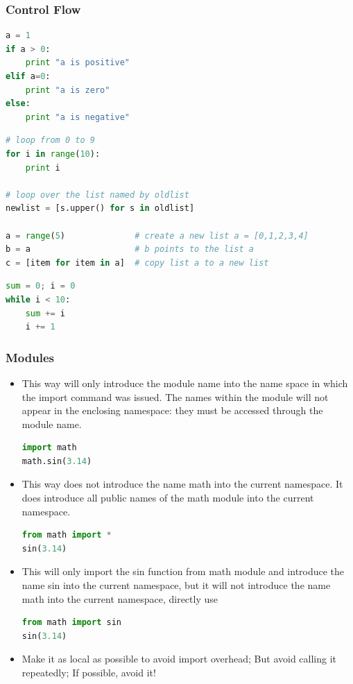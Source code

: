 \begin{frame}[fragile]
  \MyLogo
  \frametitle{Control Flow}  
\small

\medskip
{}
\begin{lstlisting}[language=python]
a = 1
if a > 0:
	print "a is positive"
elif a=0:
	print "a is zero"
else:
	print "a is negative"
\end{lstlisting}			

\begin{lstlisting}[language=python]
# loop from 0 to 9
for i in range(10):
	print i
	
# loop over the list named by oldlist
newlist = [s.upper() for s in oldlist]

a = range(5)              # create a new list a = [0,1,2,3,4]
b = a                     # b points to the list a
c = [item for item in a]  # copy list a to a new list
\end{lstlisting}	
	
\begin{lstlisting}[language=python]
sum = 0; i = 0
while i < 10:
	sum += i
	i += 1
\end{lstlisting}

\end{frame}


\begin{frame}[fragile]
  \MyLogo
  \frametitle{Modules}  
\small		

\begin{itemize}
\item This way will only introduce the module name into the name space in which the import command was issued. The names within the module will not appear in the enclosing namespace: they must be accessed through the module name.
\begin{lstlisting}[language=python,numbers=none] 
import math
math.sin(3.14)
\end{lstlisting}

\item This way does not introduce the name math into the current namespace. It does  introduce all public names of the math module into the current namespace.\begin{lstlisting}[language=python,numbers=none] 
from math import *
sin(3.14)
\end{lstlisting}

\item This will only import the sin function from math module and introduce the name sin into the current namespace, but it will not introduce the name math into the current namespace, directly use
\begin{lstlisting}[language=python,numbers=none] 
from math import sin
sin(3.14)
\end{lstlisting}

\item Make it as local as possible to avoid import overhead; But avoid calling it repeatedly; \alert{If possible, avoid it!}
\end{itemize}

\end{frame}

